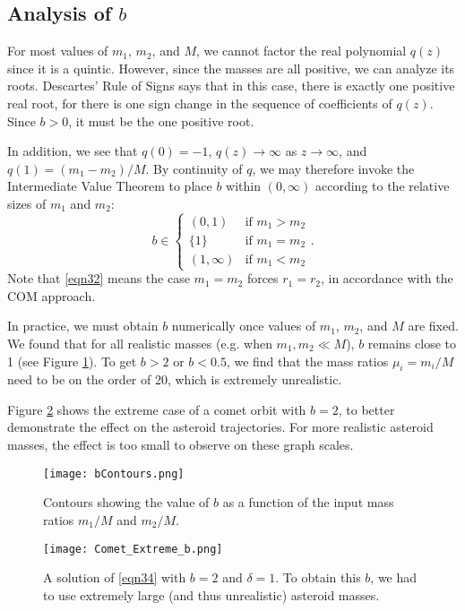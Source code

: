 \documentclass[12pt]{article}
\begin{document}
\subsection{Analysis of $b$}
For most values of $m_1$, $m_2$, and $M$, we cannot factor the real polynomial $q(z)$ since it is a quintic. However, since the masses are all positive, we can analyze its roots. Descartes' Rule of Signs says that in this case, there is exactly one positive real root, for there is one sign change in the sequence of coefficients of $q(z)$. Since $b > 0$, it must be the one positive root.

In addition, we see that $q(0) = -1$, $q(z) \to \infty$ as $z \to \infty$, and $q(1) = (m_1 - m_2)/M$. By continuity of $q$, we may therefore invoke the Intermediate Value Theorem to place $b$ within $(0, \infty)$ according to the relative sizes of $m_1$ and $m_2$:
\begin{equation}
b \in  \begin{cases} 
          (0,1) & \text{if } m_1>m_2 \\
          \{1\} & \text{if } m_1 = m_2 \\
          (1, \infty) & \text{if } m_1 < m_2
       \end{cases}.
\label{eqn32}
\end{equation}
Note that \eqref{eqn32} means the case $m_1 = m_2$ forces $r_1 = r_2$, in accordance with the COM approach.

In practice, we must obtain $b$ numerically once values of $m_1$, $m_2$, and $M$ are fixed. We found that for all realistic masses (e.g. when $m_1,m_2 \ll M$), $b$ remains close to 1 (see Figure \ref{fig3a}). To get $b > 2$ or $b < 0.5$, we find that the mass ratios $\mu_i = m_i/M$ need to be on the order of 20, which is extremely unrealistic.

Figure \ref{fig3} shows the extreme case of a comet orbit with $b = 2$, to better demonstrate the effect on the asteroid trajectories. For more realistic asteroid masses, the effect is too small to observe on these graph scales.

\begin{figure}[ht]%
\centering
\texttt{[image: bContours.png]}
\caption{Contours showing the value of $b$ as a function of the input mass ratios $m_1/M$ and $m_2/M$.}\label{fig3a}
\end{figure}

\begin{figure}[ht]%
\centering
\texttt{[image: Comet\_Extreme\_b.png]}
\caption{A solution of \eqref{eqn34} with $b = 2$ and $\delta = 1$. To obtain this $b$, we had to use extremely large (and thus unrealistic) asteroid masses.}\label{fig3}
\end{figure}
\end{document}
